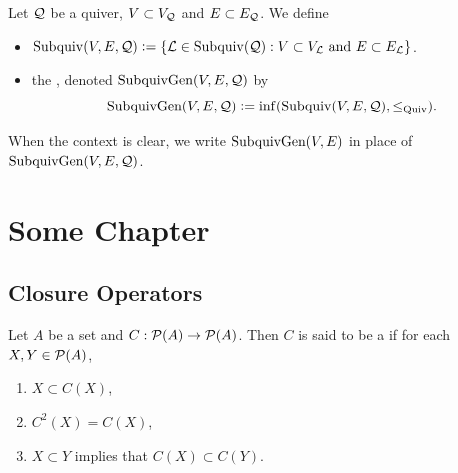 \documentclass{book}
\begin{document}
	\begin{defn}
		Let $\mathcal{Q}$ be a quiver, $V \subset V_{\mathcal{Q}}$ and $E \subset E_{\mathcal{Q}}$. We define  
		\begin{itemize}
			\item $\operatorname{Subquiv}(V, E, \mathcal{Q}) \vcentcolon= \{\mathcal{L} \in \operatorname{Subquiv}(\mathcal{Q}): \text{$V \subset V_{\mathcal{L}}$ and $E \subset E_{\mathcal{L}}$}\}$.
			\item the , denoted $\operatorname{\text{SubquivGen}}(V, E, \mathcal{Q})$ by 
			$$\operatorname{\text{SubquivGen}}(V, E, \mathcal{Q}) \vcentcolon= \inf(\operatorname{Subquiv}(V, E, \mathcal{Q}), \leq_\text{Quiv}).$$
		\end{itemize}
	\end{defn}
	
	\begin{defn}
		When the context is clear, we write $\operatorname{\text{SubquivGen}}(V, E)$ in place of $\operatorname{\text{SubquivGen}}(V, E, \mathcal{Q})$.
	\end{defn}
	
	
	
	
	
	
	
	
	
	
	
	
	
	
	
	
	
	
	
	
	
	
	
	
	
	
	
	
	
	
	
	
	
	
	
	
	
	
	
	
	
	
	
	
	
	
	
	
	
	
	
	\newpage
	\chapter{Some Chapter}
	
	\section{Closure Operators}
	
	\begin{defn}
		Let $A$ be a set and $C: \mathcal{P}(A) \rightarrow \mathcal{P}(A)$. Then $C$ is said to be a  if for each $X, Y \in \mathcal{P}(A)$,
		\begin{enumerate}
			\item $X \subset C(X)$,
			\item $C^2(X) = C(X)$,
			\item $X \subset Y$ implies that $C(X) \subset C(Y)$.
		\end{enumerate}
	\end{defn}
\end{document}
